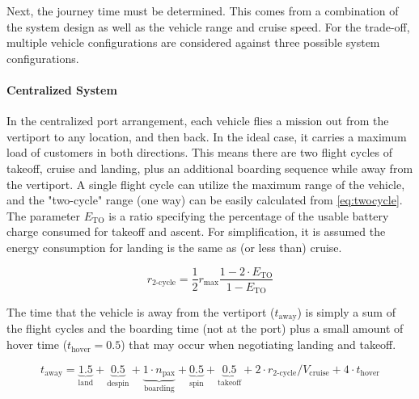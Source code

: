 Next, the journey time must be determined. This comes from a combination of the system design as well as the vehicle range and cruise speed. For the trade-off, multiple vehicle configurations are considered against three possible system configurations.

\paragraph{Centralized System}
In the centralized port arrangement, each vehicle flies a mission out from the vertiport to any location, and then back. In the ideal case, it carries a maximum load of customers in both directions. This means there are two flight cycles of takeoff, cruise and landing, plus an additional boarding sequence while away from the vertiport.
A single flight cycle can utilize the maximum range of the vehicle, and the "two-cycle" range (one way) can be easily calculated from \autoref{eq:twocycle}. The parameter $E_\text{TO}$ is a ratio specifying the percentage of the usable battery charge consumed for takeoff and ascent. For simplification, it is assumed the energy consumption for landing is the same as (or less than) cruise.

\begin{equation}\label{eq:twocycle}
    r_\text{2-cycle} = \frac{1}{2}r_\text{max}\frac{1 - 2\cdot E_\text{TO}}{1 - E_\text{TO}}
\end{equation}


The time that the vehicle is away from the vertiport ($t_\text{away}$) is simply a sum of the flight cycles and the boarding time (not at the port) plus a small amount of hover time ($t_\text{hover}=0.5$) that may occur when negotiating landing and takeoff.

\begin{equation}\label{eq:boardingOffport}
    t_\text{away} = \underbrace{1.5}_\text{land}+\underbrace{0.5}_\text{despin}+\underbrace{1\cdot n_\text{pax}}_\text{boarding} +\underbrace{0.5}_\text{spin}+\underbrace{0.5}_\text{takeoff} + 2\cdot r_\text{2-cycle}/V_\text{cruise} + 4\cdot t_\text{hover}
\end{equation}

